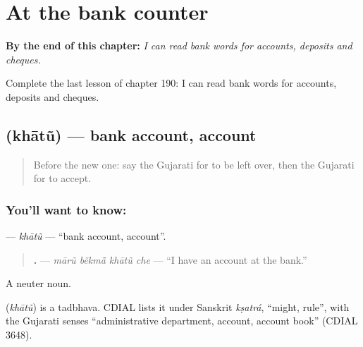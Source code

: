 
\chapter{At the bank counter}
\label{ch:gu-at-the-bank-counter}

\begin{chapteropening}
\textbf{By the end of this chapter:} \emph{I can read bank words for accounts, deposits and cheques.}

Complete the last lesson of chapter 190: I can read bank words for accounts, deposits and cheques.
\end{chapteropening}

\section[\texorpdfstring{\gu{ખાતું} (khātũ)}{ખાતું (khātũ)}]{ (khātũ) — bank account, account}

\label{lesson:GU-C190-khatu}



\begin{quote}
Before the new one: say the Gujarati for to be left over, then the Gujarati for to accept.
\end{quote}

\subsection*{You'll want to know: }
\textbf{} — \emph{khātũ} — \textquotedblleft{}bank account, account\textquotedblright{}.

\begin{quote}
\textbf{   .} — \emph{mārũ bẽkmā̃ khātũ che} — \textquotedblleft{}I have an account at the bank.\textquotedblright{}
\end{quote}

A neuter noun.

\begin{cousinweb}
\textbf{} (\emph{khātũ}) is a tadbhava. CDIAL lists it under Sanskrit \emph{kṣatrá}, \textquotedblleft{}might, rule\textquotedblright{}, with the Gujarati senses \textquotedblleft{}administrative department, account, account book\textquotedblright{} (CDIAL 3648).
\end{cousinweb}

